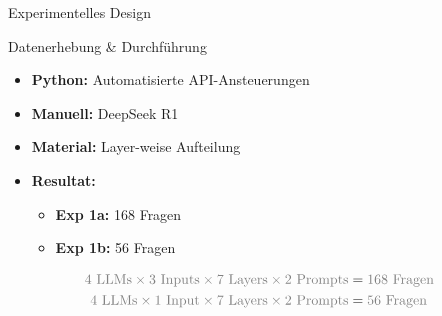 \documentclass[usenames, dvipsnames, aspectratio=32]{beamer}
\begin{document}
\begin{frame}[allowframebreaks]{Experimentelles Design}
\begin{itemize}
\begin{itemize}
            \end{itemize}
    \end{itemize}
\end{frame}

\begin{frame}{Datenerhebung \& Durchführung}
    \begin{itemize}
        \item \textbf{Python:} Automatisierte API-Ansteuerungen
        \item \textbf{Manuell:} DeepSeek R1
        \item \textbf{Material:} Layer-weise Aufteilung
        \item \textbf{Resultat:} 
            \begin{itemize}
                \item \textbf{Exp 1a:} 168 Fragen
                \item \textbf{Exp 1b:} 56 Fragen
            \end{itemize}
    \end{itemize}
    \vspace{-.25em}
    \begin{align*}
        \textcolor{gray}{4 \text{ LLMs}\times 3 \text{ Inputs}\times 7 \text{ Layers}\times 2 \text{ Prompts}} &= \textcolor{gray}{168 \text{ Fragen}} \\
        \textcolor{gray}{4 \text{ LLMs}\times 1 \text{ Input}\times 7 \text{ Layers}\times 2 \text{ Prompts}} &= \textcolor{gray}{56 \text{ Fragen}}
    \end{align*}
\end{frame}
\end{document}
